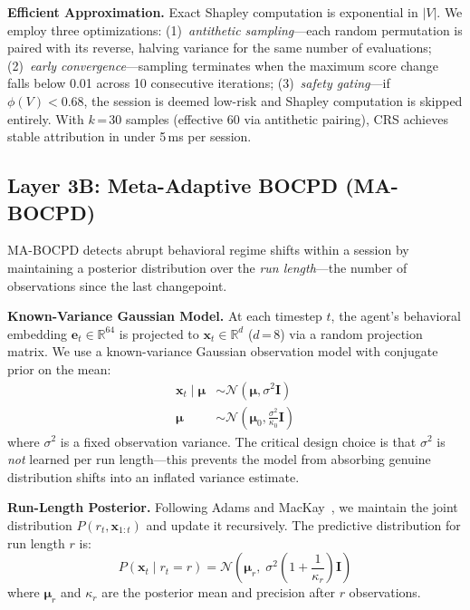\documentclass[conference,compsoc]{IEEEtran}
\begin{document}
\textbf{Efficient Approximation.} Exact Shapley computation is exponential in $|V|$. We employ three optimizations: (1)~\emph{antithetic sampling}---each random permutation is paired with its reverse, halving variance for the same number of evaluations; (2)~\emph{early convergence}---sampling terminates when the maximum score change falls below 0.01 across 10 consecutive iterations; (3)~\emph{safety gating}---if $\phi(V) < 0.68$, the session is deemed low-risk and Shapley computation is skipped entirely. With $k$\,=\,30 samples (effective 60 via antithetic pairing), CRS achieves stable attribution in under 5\,ms per session.

\subsection{Layer 3B: Meta-Adaptive BOCPD (MA-BOCPD)}
\label{sec:bocpd}

MA-BOCPD detects abrupt behavioral regime shifts within a session by maintaining a posterior distribution over the \emph{run length}---the number of observations since the last changepoint.

\textbf{Known-Variance Gaussian Model.} At each timestep $t$, the agent's behavioral embedding $\mathbf{e}_t \in \mathbb{R}^{64}$ is projected to $\mathbf{x}_t \in \mathbb{R}^{d}$ ($d$\,=\,8) via a random projection matrix. We use a known-variance Gaussian observation model with conjugate prior on the mean:
\begin{align}
\mathbf{x}_t \mid \boldsymbol{\mu} &\sim \mathcal{N}(\boldsymbol{\mu}, \sigma^2 \mathbf{I}) \\
\boldsymbol{\mu} &\sim \mathcal{N}(\boldsymbol{\mu}_0, \frac{\sigma^2}{\kappa_0} \mathbf{I})
\end{align}
where $\sigma^2$ is a fixed observation variance. The critical design choice is that $\sigma^2$ is \emph{not} learned per run length---this prevents the model from absorbing genuine distribution shifts into an inflated variance estimate.

\textbf{Run-Length Posterior.} Following Adams and MacKay~\cite{adams2007bocpd}, we maintain the joint distribution $P(r_t, \mathbf{x}_{1:t})$ and update it recursively. The predictive distribution for run length $r$ is:
\begin{equation}
P(\mathbf{x}_t \mid r_t = r) = \mathcal{N}\!\left(\boldsymbol{\mu}_r,\; \sigma^2\!\left(1 + \frac{1}{\kappa_r}\right) \mathbf{I}\right)
\end{equation}
where $\boldsymbol{\mu}_r$ and $\kappa_r$ are the posterior mean and precision after $r$ observations.
\end{document}
